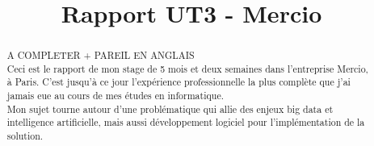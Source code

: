 \documentclass{rapportCS}
\title{Rapport UT3 - Mercio} %
\begin{document}








        
\fairemarges %
\fairepagedegarde %

\begin{center}
	\begin{abstract}
A COMPLETER + PAREIL EN ANGLAIS \\
        
Ceci est le rapport de mon stage de 5 mois et deux semaines  dans l'entreprise Mercio, à Paris. C'est jusqu'à ce jour l'expérience professionnelle la plus complète que j'ai jamais eue au cours de mes études en informatique. \\
Mon sujet tourne autour d'une problématique qui allie des enjeux big data et intelligence artificielle, mais aussi développement logiciel pour l'implémentation de la solution.
    \end{abstract}
\end{center}
\newpage


\tabledematieres %
\end{document}
